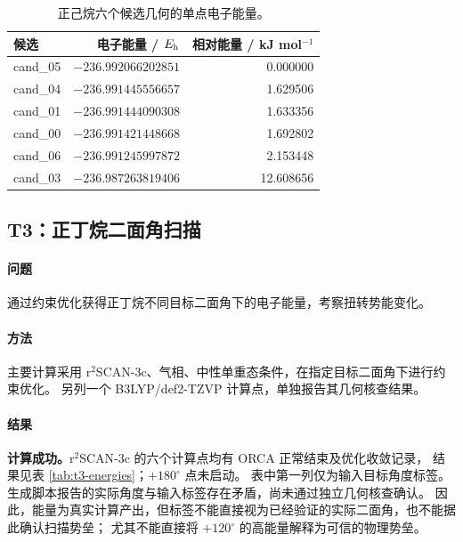 \begin{table}[H]
  \centering\small
  \caption{正己烷六个候选几何的单点电子能量。%
  }
  \label{tab:t2-energies}
  \begin{tabular}{lrr}
    \toprule
    候选 & 电子能量 / $E_{\mathrm h}$ & 相对能量 / kJ mol$^{-1}$\\
    \midrule
    cand\_05 & $-236.992066202851$ & 0.000000\\
    cand\_04 & $-236.991445556657$ & 1.629506\\
    cand\_01 & $-236.991444090308$ & 1.633356\\
    cand\_00 & $-236.991421448668$ & 1.692802\\
    cand\_06 & $-236.991245997872$ & 2.153448\\
    cand\_03 & $-236.987263819406$ & 12.608656\\
    \bottomrule
  \end{tabular}
\end{table}

\subsection{T3：正丁烷二面角扫描}
\paragraph{问题}
通过约束优化获得正丁烷不同目标二面角下的电子能量，考察扭转势能变化。

\paragraph{方法}
主要计算采用 r$^{2}$SCAN-3c、气相、中性单重态条件，在指定目标二面角下进行约束优化。%
另列一个 B3LYP/def2-TZVP 计算点，单独报告其几何核查结果。

\paragraph{结果}
\textbf{计算成功。}r$^{2}$SCAN-3c 的六个计算点均有 ORCA 正常结束及优化收敛记录，%
结果见表 \ref{tab:t3-energies}；$+180^\circ$ 点未启动。%
表中第一列仅为输入目标角度标签。%
生成脚本报告的实际角度与输入标签存在矛盾，尚未通过独立几何核查确认。%
因此，能量为真实计算产出，但标签不能直接视为已经验证的实际二面角，也不能据此确认扫描势垒；%
尤其不能直接将 $+120^\circ$ 的高能量解释为可信的物理势垒。

